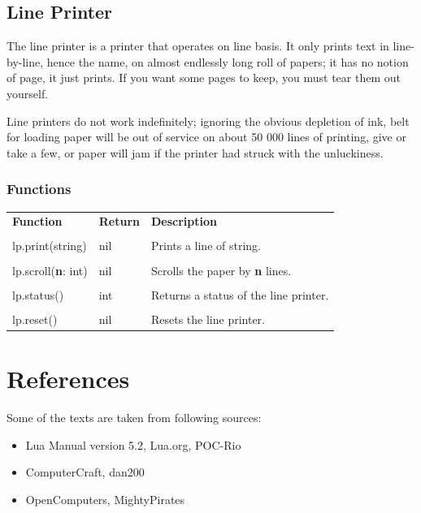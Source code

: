 \documentclass[10pt, stock]{memoir}
\let\oldsection\section
\renewcommand\section{\clearpage\oldsection}
\begin{document}
\section{Line Printer}

The line printer is a printer that operates on line basis. It only prints text in line-by-line, hence the name, on almost endlessly long roll of papers; it has no notion of page, it just prints. If you want some pages to keep, you must tear them out yourself.

Line printers do not work indefinitely; ignoring the obvious depletion of ink, belt for loading paper will be out of service on about 50 000 lines of printing, give or take a few, or paper will jam if the printer had struck with the unluckiness.

\subsection{Functions}

\begin{tabularx}{\textwidth}{l l X}
	\textbf{\large Function} & \textbf{\large Return} & \textbf{\large Description}
	\\ \\
	\endhead
	lp.print(string) & nil & Prints a line of string.
	\\ \\
	lp.scroll(\textbf{n}: int) & nil & Scrolls the paper by \textbf{n} lines.
	\\ \\
	lp.status() & int & Returns a status of the line printer.
	\\ \\
	lp.reset() & nil & Resets the line printer.
\end{tabularx}

\chapter{References}

Some of the texts are taken from following sources:

\begin{itemize}
\item Lua Manual version 5.2, Lua.org, POC-Rio
\item ComputerCraft, dan200
\item OpenComputers, MightyPirates
\end{itemize}

\afterpage{\pagestyle{empty}\null\newpage}
\end{document}
